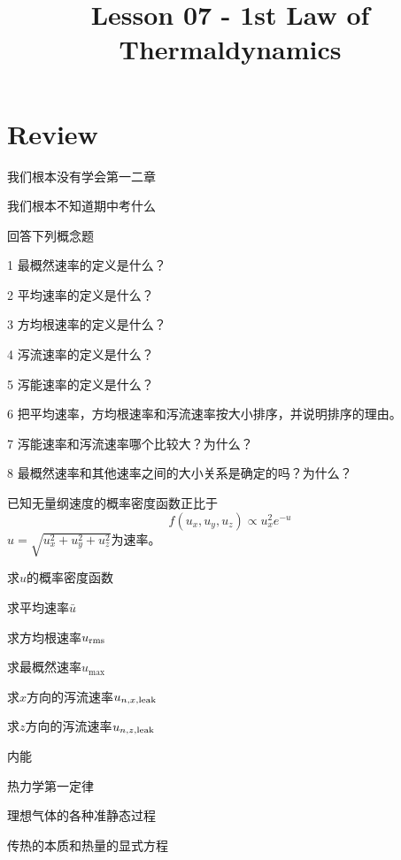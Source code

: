 \documentclass[CJK]{beamer}
\title{Lesson 07 - 1st Law of Thermaldynamics}
\author{}
\date{}
\begin{document}


\section{Review}

\begin{frame}
\bch
\bitem
\item{我们根本没有学会第一二章}
\item{我们根本不知道期中考什么}
\eitem
\ech
\end{frame}

\begin{frame}
\bch
回答下列概念题
\bitem
\item[1]{最概然速率的定义是什么？}
\item[2]{平均速率的定义是什么？}
\item[3]{方均根速率的定义是什么？}
\item[4]{泻流速率的定义是什么？}
\item[5]{泻能速率的定义是什么？}
\item[6]{把平均速率，方均根速率和泻流速率按大小排序，并说明排序的理由。}
\item[7]{泻能速率和泻流速率哪个比较大？为什么？}
\item[8]{最概然速率和其他速率之间的大小关系是确定的吗？为什么？}
\eitem

\ech
\end{frame}

\begin{frame}
\bch
{ 已知无量纲速度的概率密度函数正比于
$$f(u_x,u_y,u_z) \propto u_x^2 e^{-u}$$
$u = \sqrt{u_x^2+u_y^2+u_z^2}$为速率。
\bitem
\item{求$u$的概率密度函数}
\item{求平均速率$\bar{u}$}
\item{求方均根速率$u_{\rm rms}$}
\item{求最概然速率$u_{\max}$}
\item{求$x$方向的泻流速率$u_{n, x, \rm leak}$}
\item{求$z$方向的泻流速率$u_{n, z, \rm leak}$}
\eitem
}
\ech
\end{frame}

\begin{frame}
\bch
\bitem
\item{内能}
\item{热力学第一定律}
\item{理想气体的各种准静态过程}
\item{传热的本质和热量的显式方程}
\eitem
\ech
\end{frame}
\end{document}
